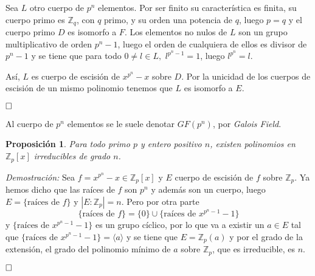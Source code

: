 \documentclass[12pt]{article}
\newtheorem{proposition}[theorem]{Proposición}
\begin{document}
Sea $L$ otro cuerpo de $p^n$ elementos. Por ser finito su característica es finita, su cuerpo primo es $\mathbb{Z}_q$, con $q$ primo, y su orden una potencia de $q$, luego $p=q$ y el cuerpo primo $D$ es isomorfo a $F$. Los elementos no nulos de $L$ son un grupo multiplicativo de orden $p^n-1$, luego el orden de cualquiera de ellos es divisor de $p^n-1$ y se tiene que para todo $0 \neq l \in L,$ $l^{p^n-1} =1$, luego $l^{p^n} = l$. 

Así, $L$ es cuerpo de escisión de $x^{p^n}-x$ sobre $D$. Por la unicidad de los cuerpos de escisión de un mismo polinomio tenemos que $L$ es isomorfo a $E$.

$\hfill \square$

Al cuerpo de $p^n$ elementos se le suele denotar $GF(p^n)$, por \textit{Galois Field}.

\begin{proposition}Para todo primo $p$ y entero positivo $n$, existen polinomios en $\mathbb{Z}_p[x]$ irreducibles de grado $n$.
\end{proposition}
\emph{Demostración: }Sea $f =x^{p^n}-x \in \mathbb{Z}_p[x]$ y $E$ cuerpo de escisión de $f$ sobre $\mathbb{Z}_p$. Ya hemos dicho que las raíces de $f$ son $p^n$ y además son un cuerpo, luego $E = \lbrace \text{raíces de $f$} \rbrace$ y $|E:\mathbb{Z}_p| = n$. Pero por otra parte $$\lbrace \text{raíces de $f$} \rbrace = \lbrace 0 \rbrace \cup \lbrace \text{raíces de $x^{p^n-1}-1$} \rbrace$$ y $\lbrace \text{raíces de $x^{p^n-1}-1$} \rbrace$ es un grupo cíclico, por lo que va a existir un $a \in E$ tal que $\lbrace \text{raíces de $x^{p^n-1}-1$} \rbrace = \langle a \rangle$ y se tiene que $E = \mathbb{Z}_p(a)$ y por el grado de la extensión, el grado del polinomio mínimo de $a$ sobre $\mathbb{Z}_p$, que es irreducible, es $n$.

$\hfill \square$
\end{document}
